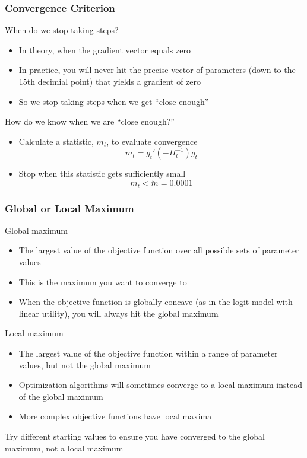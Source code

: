 \documentclass{beamer}
\begin{document}
\begin{frame}\frametitle{Convergence Criterion}
    When do we stop taking steps?
    \begin{itemize}
        \item In theory, when the gradient vector equals zero
        \item In practice, you will never hit the precise vector of parameters (down to the 15th decimial point) that yields a gradient of zero
        \item So we stop taking steps when we get ``close enough''
    \end{itemize}
    \vspace{2ex}
    How do we know when we are ``close enough?''
    \begin{itemize}
        \item Calculate a statistic, $m_t$, to evaluate convergence
        $$m_t = g_t' (-H_t^{-1})g_t$$
        \item Stop when this statistic gets sufficiently small
        $$m_t < \breve{m} = 0.0001$$
    \end{itemize}
\end{frame}

\begin{frame}\frametitle{Global or Local Maximum}
    Global maximum
    \begin{itemize}
        \item The largest value of the objective function over all possible sets of parameter values
        \item This is the maximum you want to converge to
        \item When the objective function is globally concave (as in the logit model with linear utility), you will always hit the global maximum
    \end{itemize}
    \vspace{1ex}
    Local maximum
    \begin{itemize}
        \item The largest value of the objective function within a range of parameter values, but not the global maximum
        \item Optimization algorithms will sometimes converge to a local maximum instead of the global maximum
        \item More complex objective functions have local maxima
    \end{itemize}
    \vspace{1ex}
    Try different starting values to ensure you have converged to the global maximum, not a local maximum
\end{frame}
\end{document}
